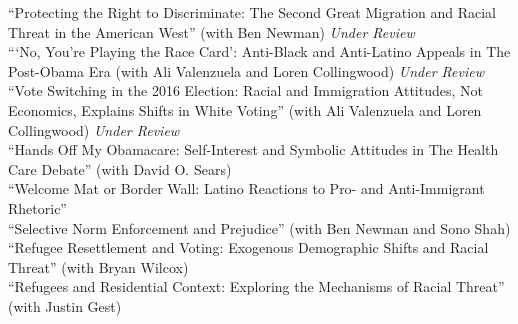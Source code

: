 \documentclass[11pt, a4paper]{article}
\newcommand{\years}[1]{\marginnote{\scriptsize #1}}
\begin{document}
\years{}``Protecting the Right to Discriminate: The Second Great Migration and Racial Threat in the American West'' (with Ben Newman) \textit{Under Review}\\
\years{}```No, You’re Playing the Race Card': Anti-Black and Anti-Latino Appeals in The Post-Obama Era (with Ali Valenzuela and Loren Collingwood) \textit{Under Review}\\
\years{}``Vote Switching in the 2016 Election: Racial and Immigration Attitudes, Not Economics, Explains Shifts in White Voting'' (with Ali Valenzuela and Loren Collingwood) \textit{Under Review}\\
\years{}``Hands Off My Obamacare: Self-Interest and Symbolic Attitudes in The Health Care Debate'' (with David O. Sears)\\
\years{}``Welcome Mat or Border Wall: Latino Reactions to Pro- and Anti-Immigrant Rhetoric''\\
\years{}``Selective Norm Enforcement and Prejudice'' (with Ben Newman and Sono Shah)\\
\years{}``Refugee Resettlement and Voting: Exogenous Demographic Shifts and Racial Threat'' (with Bryan Wilcox)\\
\years{}``Refugees and Residential Context: Exploring the Mechanisms of Racial Threat'' (with Justin Gest)\\


\end{document}
